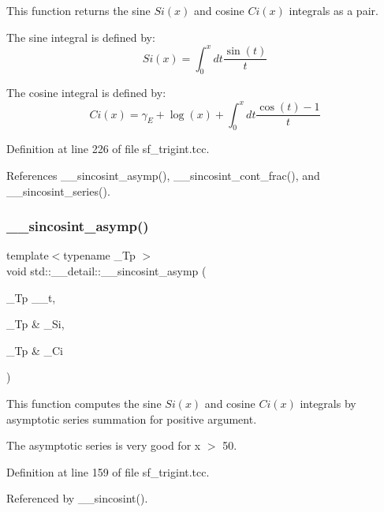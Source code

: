 This function returns the sine $ Si(x) $ and cosine $ Ci(x) $ integrals as a {\ttfamily pair}. 

The sine integral is defined by\+: \[ Si(x) = \int_0^x dt \frac{\sin(t)}{t} \]

The cosine integral is defined by\+: \[ Ci(x) = \gamma_E + \log(x) + \int_0^x dt \frac{\cos(t) - 1}{t} \] 

Definition at line 226 of file sf\+\_\+trigint.\+tcc.



References \+\_\+\+\_\+sincosint\+\_\+asymp(), \+\_\+\+\_\+sincosint\+\_\+cont\+\_\+frac(), and \+\_\+\+\_\+sincosint\+\_\+series().

\mbox{\label{namespacestd_1_1____detail_a976c3ff52c54001de3d409900c9bcb9c}} 
\subsubsection{\texorpdfstring{\+\_\+\+\_\+sincosint\+\_\+asymp()}{\_\_sincosint\_asymp()}}
{\footnotesize\ttfamily template$<$typename \+\_\+\+Tp $>$ \\
void std\+::\+\_\+\+\_\+detail\+::\+\_\+\+\_\+sincosint\+\_\+asymp (\begin{DoxyParamCaption}\item[{\+\_\+\+Tp}]{\+\_\+\+\_\+t,  }\item[{\+\_\+\+Tp \&}]{\+\_\+\+Si,  }\item[{\+\_\+\+Tp \&}]{\+\_\+\+Ci }\end{DoxyParamCaption})}



This function computes the sine $ Si(x) $ and cosine $ Ci(x) $ integrals by asymptotic series summation for positive argument. 

The asymptotic series is very good for x $>$ 50. 

Definition at line 159 of file sf\+\_\+trigint.\+tcc.



Referenced by \+\_\+\+\_\+sincosint().

\mbox{\label{namespacestd_1_1____detail_a211f552bca2944f64e3a1f5593690fda}} 
